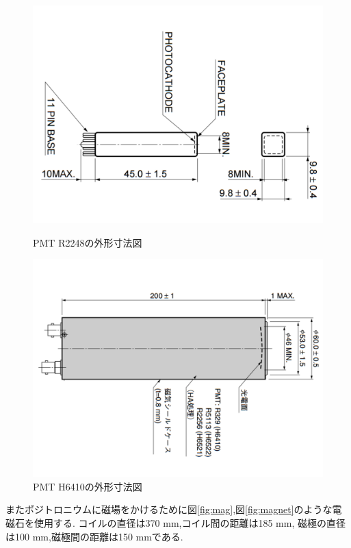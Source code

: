 \begin{figure}[htbp]
\begin{minipage}{0.5\hsize}
\centering
\includegraphics[keepaspectratio,angle=90,scale=0.4]{fig/ybm/pmtmini.pdf}
	\caption{PMT R2248の外形寸法図\cite{pmtshape}}
\label{fig:pmtmini}
\end{minipage}
\begin{minipage}{0.5\hsize}
\centering
\includegraphics[keepaspectratio,angle=90,scale=0.4]{fig/ybm/pmtbig.pdf}
	\caption{PMT H6410の外形寸法図\cite{pmtshape}}
\label{fig:pmtbig}
\end{minipage}
\end{figure}

またポジトロニウムに磁場をかけるために図\ref{fig:mag},図\ref{fig:magnet}のような電磁石を使用する.
コイルの直径は370 mm,コイル間の距離は185 mm,
磁極の直径は100 mm,磁極間の距離は150 mmである.

